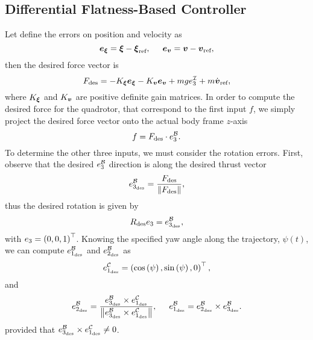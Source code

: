 \subsection{Differential Flatness-Based Controller}
Let define the errors on position and velocity as
\begin{equation*}
    \boldsymbol{e}_{\boldsymbol{\xi}} = \boldsymbol{\xi} - \boldsymbol{\xi}_{\text{ref}}, \hspace{0.5cm} \boldsymbol{e}_{\boldsymbol{v}} = \boldsymbol{v} - \boldsymbol{v}_{\text{ref}},
\end{equation*}
then the desired force vector is
\begin{equation*}
    F_{\text{des}} = - K_{\boldsymbol{\xi}} \boldsymbol{e}_{\boldsymbol{\xi}} - K_{\boldsymbol{v}} \boldsymbol{e}_{\boldsymbol{v}} + mg e_3^{\mathcal{I}} + m\dot{\boldsymbol{v}}_{\text{ref}},
\end{equation*}
where $K_{\boldsymbol{\xi}}$ and $K_{\boldsymbol{v}}$ are positive definite gain matrices.
In order to compute the desired force for the quadrotor, that correspond to the first input $f$, we simply project the desired
force vector onto the actual body frame $z$-axis
\begin{equation*}
    f = F_{\text{des}} \cdot e_3^{\mathcal{B}}.
\end{equation*}
To determine the other three inputs, we must consider the rotation errors.
First, observe that the desired $e_3^{\mathcal{B}}$ direction is along the desired thrust vector
\begin{equation*}
    e_{3_{\text{des}}}^{\mathcal{B}} = \frac{F_{\text{des}}}{\left \lVert {F_{\text{des}}} \right \rVert},
\end{equation*}
thus the desired rotation is given by
\begin{equation*}
    R_{\text{des}} e_3 = e_{3_{\text{des}}}^{\mathcal{B}},
\end{equation*}
with $e_3 = \left( 0, 0, 1\right)^{\top}$.
Knowing the specified yaw angle along the trajectory, $\psi(t)$, we can compute $e_{1_{\text{des}}}^{\mathcal{B}}$ and
$e_{2_{\text{des}}}^{\mathcal{B}}$ as
\begin{equation*}
    e_{1_{\text{des}}}^{\mathcal{C}} = \left( \cos\left( \psi \right), \sin\left( \psi \right), 0 \right)^{\top},
\end{equation*}
and 
\begin{equation*}
    e_{2_{\text{des}}}^{\mathcal{B}} = \frac{e_{3_{\text{des}}}^{\mathcal{B}} \times e_{1_{\text{des}}}^{\mathcal{C}}}{\left \lVert {e_{3_{\text{des}}}^{\mathcal{B}} \times e_{1_{\text{des}}}^{\mathcal{C}}} \right \rVert},
    \hspace{0.5cm} e_{1_{\text{des}}}^{\mathcal{B}} = e_{2_{\text{des}}}^{\mathcal{B}} \times e_{3_{\text{des}}}^{\mathcal{B}}.
\end{equation*}
provided that $e_{3_{\text{des}}}^{\mathcal{B}} \times e_{1_{\text{des}}}^{\mathcal{C}} \ne 0$.

